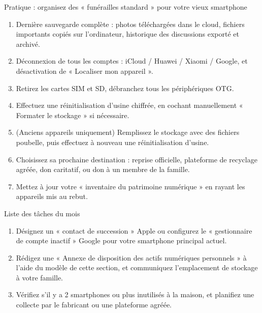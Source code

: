 \begin{tcbpractice}{Pratique : organisez des « funérailles standard » pour votre vieux smartphone}
\begin{enumerate}
  \item Dernière sauvegarde complète : photos téléchargées dans le cloud, fichiers importants copiés sur l'ordinateur, historique des discussions exporté et archivé.
  \item Déconnexion de tous les comptes : iCloud / Huawei / Xiaomi / Google, et désactivation de « Localiser mon appareil ».
  \item Retirez les cartes SIM et SD, débranchez tous les périphériques OTG.
  \item Effectuez une réinitialisation d'usine chiffrée, en cochant manuellement « Formater le stockage » si nécessaire.
  \item (Anciens appareils uniquement) Remplissez le stockage avec des fichiers poubelle, puis effectuez à nouveau une réinitialisation d'usine.
  \item Choisissez sa prochaine destination : reprise officielle, plateforme de recyclage agréée, don caritatif, ou don à un membre de la famille.
  \item Mettez à jour votre « inventaire du patrimoine numérique » en rayant les appareils mis au rebut.
\end{enumerate}

\end{tcbpractice}

\begin{tcbpractice}{Liste des tâches du mois}
\begin{enumerate}
  \item Désignez un « contact de succession » Apple ou configurez le « gestionnaire de compte inactif » Google pour votre smartphone principal actuel.
  \item Rédigez une « Annexe de disposition des actifs numériques personnels » à l'aide du modèle de cette section, et communiquez l'emplacement de stockage à votre famille.
  \item Vérifiez s'il y a 2 smartphones ou plus inutilisés à la maison, et planifiez une collecte par le fabricant ou une plateforme agréée.
\end{enumerate}

\end{tcbpractice}
